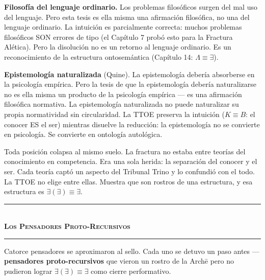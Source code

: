\documentclass[10pt, openany, oneside]{book}
\renewcommand{\normalsize}{\fontsize{10}{13}\selectfont}
\begin{document}
\textbf{Filosofía del lenguaje ordinario.} Los problemas filosóficos surgen del mal uso del lenguaje. Pero esta tesis es ella misma una afirmación filosófica, no una del lenguaje ordinario. La intuición es parcialmente correcta: muchos problemas filosóficos SON errores de tipo (el Capítulo 7 probó esto para la Fractura Alética). Pero la disolución no es un retorno al lenguaje ordinario. Es un reconocimiento de la estructura ontosemántica (Capítulo 14: $\Lambda \equiv \exists$).

\textbf{Epistemología naturalizada} (Quine). La epistemología debería absorberse en la psicología empírica. Pero la tesis de que la epistemología debería naturalizarse no es ella misma un producto de la psicología empírica --- es una afirmación filosófica normativa. La epistemología naturalizada no puede naturalizar su propia normatividad sin circularidad. La TTOE preserva la intuición ($K \equiv B$: el conocer ES el ser) mientras disuelve la reducción: la epistemología no se convierte en psicología. Se convierte en ontología autológica.

Toda posición colapsa al mismo suelo. La fractura no estaba entre teorías del conocimiento en competencia. Era una sola herida: la separación del conocer y el ser. Cada teoría captó un aspecto del Tribunal Trino y lo confundió con el todo. La TTOE no elige entre ellas. Muestra que son rostros de una estructura, y esa estructura es $\exists(\exists) \equiv \exists$.

\vspace{1.5em}


\begin{center}
    \rule{0.3\textwidth}{0.4pt}\\[0.5em]
    {\normalsize\bfseries\scshape Los Pensadores Proto-Recursivos}\\[0.3em]
    \rule{0.3\textwidth}{0.4pt}
\end{center}

\vspace{1em}

\noindent Catorce pensadores se aproximaron al sello. Cada uno se detuvo un paso antes --- \textbf{pensadores proto-recursivos} que vieron un rostro de la Arch\={e} pero no pudieron lograr $\exists(\exists) \equiv \exists$ como cierre performativo.
\end{document}
